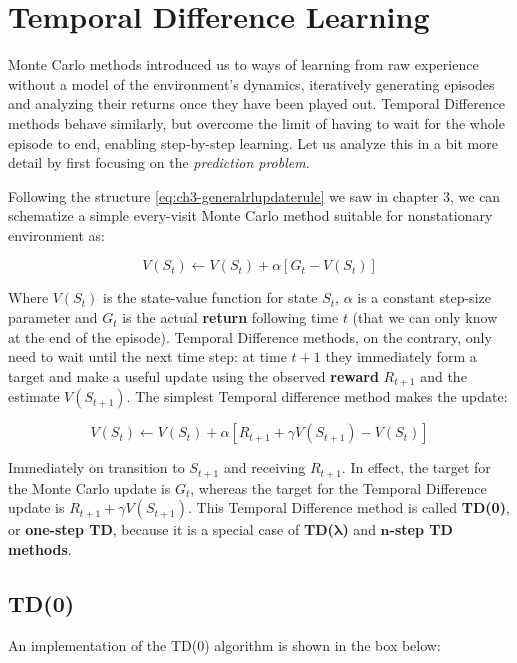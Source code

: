 \chapter{Temporal Difference Learning}
Monte Carlo methods introduced us to ways of learning from raw experience without a model of the environment’s dynamics, iteratively generating episodes and analyzing their returns once they have been played out. Temporal Difference methods behave similarly, but overcome the limit of having to wait for the whole episode to end, enabling step-by-step learning. Let us analyze this in a bit more detail by first focusing on the \textit{prediction problem}.

Following the structure \eqref{eq:ch3-generalrlupdaterule} we saw in chapter 3, we can schematize a simple every-visit Monte Carlo method suitable for nonstationary environment as:

\begin{equation*}
    V(S_t) \leftarrow V(S_t) + \alpha \left[ G_t - V(S_t) \right]
\end{equation*}

Where $V(S_t)$ is the state-value function for state $S_t$, $\alpha$ is a constant step-size parameter and $G_t$ is the actual \textbf{return} following time $t$ (that we can only know at the end of the episode). Temporal Difference methods, on the contrary, only need to wait until the next time step: at time $t+1$ they immediately form a target and make a useful update using the observed \textbf{reward} $R_{t+1}$ and the estimate $V(S_{t+1})$. The simplest Temporal difference method makes the update:

\begin{equation}
    V(S_t) \leftarrow V(S_t) + \alpha \left[ R_{t+1} + \gamma V(S_{t+1}) - V(S_t) \right]
    \label{eq:ch5-genericonpolicytdupdate}
\end{equation}

Immediately on transition to $S_{t+1}$ and receiving $R_{t+1}$. In effect, the target for the Monte Carlo update is $G_t$, whereas the target for the Temporal Difference update is $R_{t+1} + \gamma V(S_{t+1})$. This Temporal Difference method is called \textbf{TD(0)}, or \textbf{one-step TD}, because it is a special case of \textbf{TD(}$\boldsymbol{\lambda}$\textbf{)} and $\boldsymbol{n}$\textbf{-step TD methods}.

\section{TD(0)}
An implementation of the TD(0) algorithm is shown in the box below:

